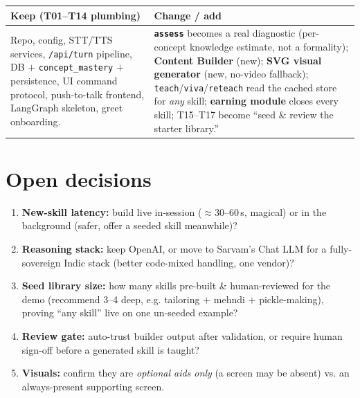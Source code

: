 \documentclass[11pt]{article}
\newcommand{\code}[1]{\texttt{#1}}
\begin{document}
\begin{center}
\renewcommand{\arraystretch}{1.2}
\begin{tabular}{p{5.3cm} p{7.4cm}}
\toprule
\textbf{Keep (T01--T14 plumbing)} & \textbf{Change / add} \\
\midrule
Repo, config, STT/TTS services, \code{/api/turn} pipeline, DB $+$ \code{concept\_mastery} $+$
persistence, UI command protocol, push-to-talk frontend, LangGraph skeleton, greet onboarding. &
\textbf{\code{assess}} becomes a real diagnostic (per-concept knowledge estimate, not a formality);
\textbf{Content Builder} (new); \textbf{SVG visual generator} (new, no-video fallback);
\code{teach}/\code{viva}/\code{reteach} read the cached store for \emph{any} skill; \textbf{earning
module} closes every skill; T15--T17 become ``seed \& review the starter library.'' \\
\bottomrule
\end{tabular}
\end{center}

\section{Open decisions}

\begin{enumerate}
  \item \textbf{New-skill latency:} build live in-session ($\approx$30--60\,s, magical) or in the
  background (safer, offer a seeded skill meanwhile)?
  \item \textbf{Reasoning stack:} keep OpenAI, or move to Sarvam's Chat LLM for a fully-sovereign
  Indic stack (better code-mixed handling, one vendor)?
  \item \textbf{Seed library size:} how many skills pre-built \& human-reviewed for the demo
  (recommend 3--4 deep, e.g. tailoring $+$ mehndi $+$ pickle-making), proving ``any skill'' live on
  one un-seeded example?
  \item \textbf{Review gate:} auto-trust builder output after validation, or require human sign-off
  before a generated skill is taught?
  \item \textbf{Visuals:} confirm they are \emph{optional aids only} (a screen may be absent) vs. an
  always-present supporting screen.
\end{enumerate}
\end{document}
